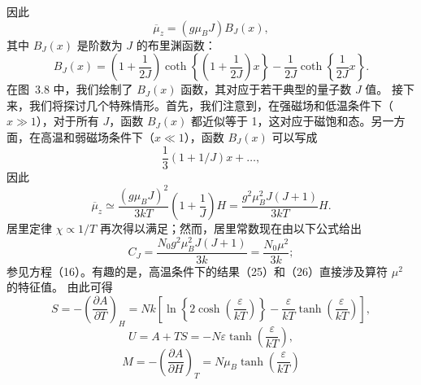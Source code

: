 因此
\begin{equation}\tag{3.5.102}\label{eq:3.5.102}
\overline { { \mu } } _ { z } = ( g \mu _ { B } J ) B _ { J } ( x ) ,
\end{equation}
其中 \(B_{J}(x)\) 是阶数为 \(J\) 的布里渊函数：
\begin{equation}\tag{3.5.103}\label{eq:3.5.103}
B _ { J } ( x ) = \left( 1 + \frac { 1 } { 2 J } \right) \coth \left\{ \left( 1 + \frac { 1 } { 2 J } \right) x \right\} - \frac { 1 } { 2 J } \coth \left\{ \frac { 1 } { 2 J } x \right\} .
\end{equation}
在图~3.8 中，我们绘制了 \(B_{J}(x)\) 函数，其对应于若干典型的量子数 \(J\) 值。
接下来，我们将探讨几个特殊情形。首先，我们注意到，在强磁场和低温条件下（\(x \gg 1\)），对于所有 \(J\)，函数 \(B_{J}(x)\) 都近似等于 1，这对应于磁饱和态。另一方面，在高温和弱磁场条件下（\(x \ll 1\)），函数 \(B_{J}(x)\) 可以写成
\begin{equation}\tag{3.5.104}\label{eq:3.5.104}
\frac { 1 } { 3 } ( 1 + 1 / J ) x + \ldots ,
\end{equation}
因此
\begin{equation}\tag{3.5.105}\label{eq:3.5.105}
\overline { { \mu } } _ { z } \simeq \frac { ( g \mu _ { B } J ) ^{2} } { 3 k T } \left( 1 + \frac { 1 } { J } \right) H = \frac { g ^{2} \mu _ { B } ^{2} J ( J + 1 ) } { 3 k T } H .
\end{equation}
居里定律 \(\chi \propto 1/T\) 再次得以满足；然而，居里常数现在由以下公式给出
\begin{equation}\tag{3.5.106}\label{eq:3.5.106}
C _ { J } = \frac { N _ { 0 } g ^{2} \mu _ { B } ^{2} J ( J + 1 ) } { 3 k } = \frac { N _ { 0 } \mu ^{2} } { 3 k } ;
\end{equation}
参见方程（16）。有趣的是，高温条件下的结果（25）和（26）直接涉及算符 \(\mu^{2}\) 的特征值。
由此可得
\begin{equation}\tag{3.5.107}\label{eq:3.5.107}
S = - \left( \frac { \partial A } { \partial T } \right) _ { H } = N k \left[ \ln \left\{ 2 \cosh \left( \frac { \varepsilon } { k T } \right) \right\} - \frac { \varepsilon } { k T } \operatorname { t a n h } \left( \frac { \varepsilon } { k T } \right) \right] ,
\end{equation}
\begin{equation}\tag{3.5.108}\label{eq:3.5.108}
U = A + T S = - N \varepsilon \operatorname { t a n h } \left( \frac { \varepsilon } { k T } \right) ,
\end{equation}
\begin{equation}\tag{3.5.109}\label{eq:3.5.109}
M = - \left( \frac { \partial A } { \partial H } \right) _ { T } = N \mu _ { B } \operatorname { t a n h } \left( \frac { \varepsilon } { k T } \right)
\end{equation}
